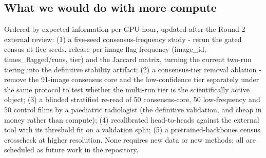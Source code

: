 \subsection{What we would do with more compute}
Ordered by expected information per GPU-hour, updated after the
Round-2 external review: (1) a five-seed consensus-frequency study -
rerun the gated census at five seeds, release per-image flag frequency
(image\_id, times\_flagged/runs, tier) and the Jaccard matrix, turning
the current two-run tiering into the definitive stability artifact;
(2) a consensus-tier removal ablation - remove the 91-image consensus
core and the low-confidence tier separately under the same protocol to
test whether the multi-run tier is the scientifically active object;
(3) a blinded stratified re-read of 50 consensus-core, 50 low-frequency
and 50 control films by a paediatric radiologist (the definitive
validation, and cheap in money rather than compute); (4) recalibrated
head-to-heads against the external tool with its threshold fit on a
validation split; (5) a pretrained-backbones census crosscheck at
higher resolution. None requires new data or new methods; all are
scheduled as future work in the repository.
